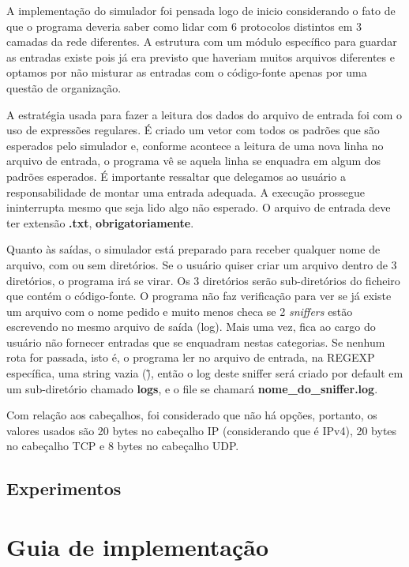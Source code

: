\documentclass[11pt]{article}
\begin{document}
A implementação do simulador foi pensada logo de inicio considerando o fato de que o programa deveria saber como lidar com 6 protocolos distintos em 3 camadas da rede diferentes. A estrutura com um módulo específico para guardar as entradas existe pois já era previsto que haveriam muitos arquivos diferentes e optamos por não misturar as entradas com o código-fonte apenas por uma questão de organização.

A estratégia usada para fazer a leitura dos dados do arquivo de entrada foi com o uso de expressões regulares. É criado um vetor com todos os padrões que são esperados pelo simulador e, conforme acontece a leitura de uma nova linha no arquivo de entrada, o programa vê se aquela linha se enquadra em algum dos padrões esperados. É importante ressaltar que delegamos ao usuário a responsabilidade de montar uma entrada adequada. A execução prossegue ininterrupta mesmo que seja lido algo não esperado. O arquivo de entrada deve ter extensão \textbf{.txt}, \textbf{\textcolor{warning}{obrigatoriamente}}.

Quanto às saídas, o simulador está preparado para receber qualquer nome de arquivo, com ou sem diretórios. Se o usuário quiser criar um arquivo dentro de 3 diretórios, o programa irá se virar. Os 3 diretórios serão sub-diretórios do ficheiro que contém o código-fonte. O programa não faz verificação para ver se já existe um arquivo com o nome pedido e muito menos checa se 2 \textit{sniffers} estão escrevendo no mesmo arquivo de saída (log). Mais uma vez, fica ao cargo do usuário não fornecer entradas que se enquadram nestas categorias. Se nenhum rota for passada, isto é, o programa ler no arquivo de entrada, na REGEXP específica, uma string vazia (\"\"), então o log deste sniffer será criado por default em um sub-diretório chamado \textbf{logs}, e o file se chamará \textbf{nome\_do\_sniffer.log}.

Com relação aos cabeçalhos, foi considerado que não há opções, portanto, os valores usados são 20 bytes no cabeçalho IP (considerando que é IPv4), 20 bytes no cabeçalho TCP e 8 bytes no cabeçalho UDP.

\subsection{Experimentos}


\section{Guia de implementação}
\end{document}
